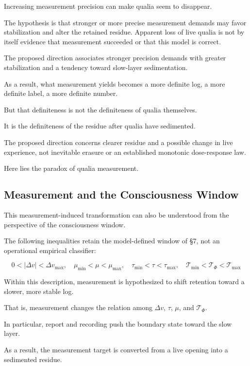 Increasing measurement precision can make qualia seem to disappear.

The hypothesis is that stronger or more precise measurement demands may favor stabilization and alter the retained residue. Apparent loss of live qualia is not by itself evidence that measurement succeeded or that this model is correct.

The proposed direction associates stronger precision demands with greater stabilization and a tendency toward slow-layer sedimentation.

As a result, what measurement yields becomes a more definite log, a more definite label, a more definite number.

But that definiteness is not the definiteness of qualia themselves.

It is the definiteness of the residue after qualia have sedimented.

The proposed direction concerns clearer residue and a possible change in live experience, not inevitable erasure or an established monotonic dose-response law.

Here lies the paradox of qualia measurement.

\subsection{Measurement and the Consciousness Window}


This measurement-induced transformation can also be understood from the perspective of the consciousness window.

The following inequalities retain the model-defined window of §7, not an operational empirical classifier:

\begin{equation}
0 < |\Delta v| < \Delta v_{\max}, \quad \mu_{\min} < \mu < \mu_{\max}, \quad \tau_{\min} < \tau < \tau_{\max}, \quad \mathcal{T}_{\min} < \mathcal{T}_{\Phi} < \mathcal{T}_{\max}
\end{equation}

Within this description, measurement is hypothesized to shift retention toward a slower, more stable log.

That is, measurement changes the relation among $\Delta v$, $\tau$, $\mu$, and $\mathcal{T}_{\Phi}$.

In particular, report and recording push the boundary state toward the slow layer.

As a result, the measurement target is converted from a live opening into a sedimented residue.

